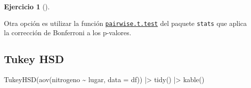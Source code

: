 \documentclass[
  a4paper,
]{scrreport}
\newenvironment{Shaded}{\begin{snugshade}}{\end{snugshade}}
\newcommand{\AttributeTok}[1]{\textcolor[rgb]{0.40,0.45,0.13}{#1}}
\newcommand{\FunctionTok}[1]{\textcolor[rgb]{0.28,0.35,0.67}{#1}}
\newcommand{\NormalTok}[1]{\textcolor[rgb]{0.00,0.23,0.31}{#1}}
\newcommand{\SpecialCharTok}[1]{\textcolor[rgb]{0.37,0.37,0.37}{#1}}
\theoremstyle{definition}
\newtheorem{exercise}{Ejercicio}[chapter]
\theoremstyle{remark}
\begin{document}
\begin{exercise}[]
\begin{enumerate}
\begin{tcolorbox}
  Otra opción es utilizar la función
  \href{https://rdrr.io/r/stats/pairwise.t.test.html}{\texttt{pairwise.t.test}}
  del paquete \texttt{stats} que aplica la corrección de Bonferroni a
  los p-valores.

  \end{tcolorbox}

  \begin{tcolorbox}[enhanced jigsaw, colframe=quarto-callout-tip-color-frame, toprule=.15mm, bottomtitle=1mm, breakable, opacitybacktitle=0.6, toptitle=1mm, colback=white, bottomrule=.15mm, title=\textcolor{quarto-callout-tip-color}{\faLightbulb}\hspace{0.5em}{Solución}, arc=.35mm, left=2mm, titlerule=0mm, rightrule=.15mm, coltitle=black, leftrule=.75mm, opacityback=0, colbacktitle=quarto-callout-tip-color!10!white]

  \section{Tukey HSD}

\begin{Shaded}
\begin{Highlighting}[]
\FunctionTok{TukeyHSD}\NormalTok{(}\FunctionTok{aov}\NormalTok{(nitrogeno }\SpecialCharTok{\textasciitilde{}}\NormalTok{ lugar, }\AttributeTok{data =}\NormalTok{ df)) }\SpecialCharTok{|\textgreater{}} 
    \FunctionTok{tidy}\NormalTok{() }\SpecialCharTok{|\textgreater{}} 
    \FunctionTok{kable}\NormalTok{()}
\end{Highlighting}
\end{Shaded}


\end{tcolorbox}
\end{enumerate}
\end{exercise}
\end{document}
